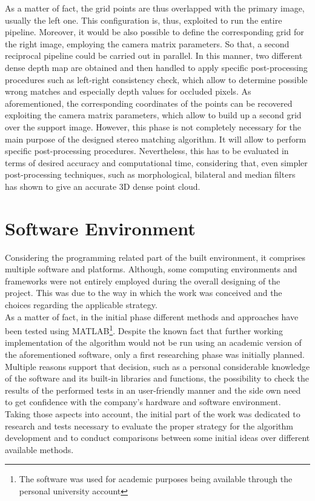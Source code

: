 As a matter of fact, the grid points are thus overlapped with the primary image, usually the left one. 
This configuration is, thus, exploited to run the entire pipeline. 
Moreover, it would be also possible to define the corresponding grid for the right image, employing the camera matrix parameters. 
So that, a second reciprocal pipeline could be carried out in parallel. 
In this manner, two different dense depth map are obtained and then handled to apply specific post-processing procedures such as left-right consistency check, which allow to determine possible wrong matches and especially depth values for occluded pixels. 
As aforementioned, the corresponding coordinates of the points can be recovered exploiting the camera matrix parameters, which allow to build up a second grid over the support image. 
However, this phase is not completely necessary for the main purpose of the designed stereo matching algorithm.
It will allow to perform specific post-processing procedures. 
Nevertheless, this has to be evaluated in terms of desired accuracy and computational time, considering that, even simpler post-processing techniques, such as morphological, bilateral and median filters has shown to give an accurate 3D dense point cloud.

\section{Software Environment}
\label{section:software-env}

Considering the programming related part of the built environment, it comprises multiple software and platforms. 
Although, some computing environments and frameworks were not entirely employed during the overall designing of the project.
This was due to the way in which the work was conceived and the choices regarding the applicable strategy. \\
As a matter of fact, in the initial phase different methods and approaches have been tested using MATLAB\footnote{The software was used for academic purposes being available through the personal university account}. 
Despite the known fact that further working implementation of the algorithm would not be run using an academic version of the aforementioned software, only a first researching phase was initially planned.
Multiple reasons support that decision, such as a personal considerable knowledge of the software and its built-in libraries and functions, the possibility to check the results of the performed tests in an user-friendly manner and the side own need to get confidence with the company's hardware and software environment.\\
Taking those aspects into account, the initial part of the work was dedicated to research and tests necessary to evaluate the proper strategy for the algorithm development and to conduct comparisons between some initial ideas over different available methods.

